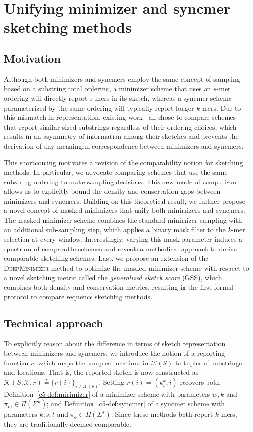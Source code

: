 \section{Unifying minimizer and syncmer sketching methods}
\subsection{Motivation}
Although both minimizers and syncmers employ the same concept of sampling based on a substring total ordering, a minimizer scheme that uses an $s$-mer ordering will directly report $s$-mers in its sketch, whereas a syncmer scheme parameterized by the same ordering will typically report longer $k$-mers. Due to this mismatch in representation, existing work~\cite{edgar2021syncmers,shaw2021theory} all chose to compare schemes that report similar-sized substrings regardless of their ordering choices, which results in an asymmetry of information among their sketches and prevents the derivation of any meaningful correspondence between minimizers and syncmers. 

This shortcoming motivates a revision of the comparability notion for sketching methods. In particular, we advocate comparing schemes that use the same substring ordering to make sampling decisions. This new mode of comparison allows us to explicitly bound the density and conservation gaps between minimizers and syncmers. Building on this theoretical result, we further propose a novel concept of masked minimizers that unify both minimizers and syncmers. The masked minimizer scheme combines the standard minimizer sampling with an additional sub-sampling step, which applies a binary mask filter to the $k$-mer selection at every window. Interestingly, varying this mask parameter induces a spectrum of comparable schemes and reveals a methodical approach to derive comparable sketching schemes. Last, we propose an extension of the \textsc{DeepMinimizer} method to optimize the masked minimizer scheme with respect to a novel sketching metric called the \emph{generalized sketch score} (GSS), which combines both  density and conservation metrics, resulting in the first formal protocol to compare sequence sketching methods.
\subsection{Technical approach}
To explicitly reason about the difference in terms of sketch representation between minimizers and syncmers, we introduce the notion of a reporting function $r$, which maps the sampled locations in $\mathcal{X}(S)$ to tuples of substrings and locations. That is, the reported sketch is now constructed as $\mathcal{K}(S; \mathcal{X}, r) \triangleq \{r(i)\}_{i \in \mathcal{X}(S)}$. Setting $r(i) = (\kappa^k_i, i)$ recovers both Definition~\ref{c5-def:minimizer} of a minimizer scheme with parameters $w, k$ and $\pi_m \in \Pi(\Sigma^k)$; and Definition~\ref{c5-def:syncmer} of a syncmer scheme with parameters $k, s, t$ and $\pi_o \in \Pi(\Sigma^s)$. Since these methods both report $k$-mers, they are traditionally deemed comparable.

